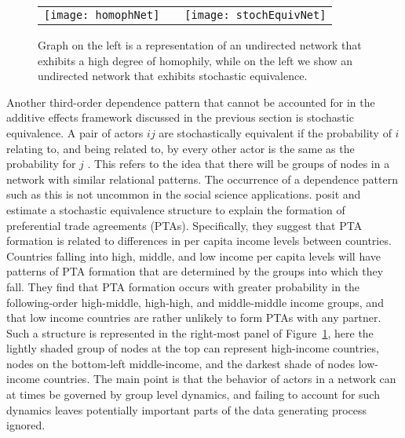 \begin{figure}[ht]
	\centering
	\begin{tabular}{lcr}
	\texttt{[image: homophNet]} & \hspace{2cm} &
	\texttt{[image: stochEquivNet]}	
	\end{tabular}
	\caption{Graph on the left is a representation of an undirected network that exhibits a high degree of homophily, while on the left we show an undirected network that exhibits stochastic equivalence. }
	\label{fig:homphStochEquivNet}
\end{figure}

Another third-order dependence pattern that cannot be accounted for in the additive effects framework discussed in the previous section is stochastic equivalence. A pair of actors $ij$ are stochastically equivalent if the probability of $i$ relating to, and being related to, by every other actor is the same as the probability for $j$ \citep{anderson:etal:1992}. This refers to the idea that there will be groups of nodes in a network with similar relational patterns. The occurrence of a dependence pattern such as this is not uncommon in the social science applications. \citet{manger:etal:2012} posit and estimate a stochastic equivalence structure to explain the formation of preferential trade agreements (PTAs). Specifically, they suggest that PTA formation is related to differences in per capita income levels between countries. Countries falling into high, middle, and low income per capita levels will have patterns of PTA formation that are determined by the groups into which they fall. They find that PTA formation occurs with greater probability in the following-order high-middle, high-high, and middle-middle income groups, and that low income countries are rather unlikely to form PTAs with any partner. Such a structure is represented in the right-most panel of Figure~\ref{fig:homphStochEquivNet}, here the lightly shaded group of nodes at the top can represent high-income countries, nodes on the bottom-left middle-income, and the darkest shade of nodes low-income countries. The main point is that the behavior of actors in a network can at times be governed by group level dynamics, and failing to account for such dynamics leaves potentially important parts of the data generating process ignored. 

